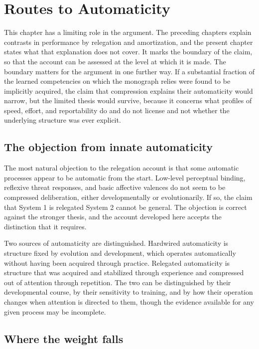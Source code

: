 \documentclass[11pt]{report}
\theoremstyle{remark}
\theoremstyle{definition}
\begin{document}
\chapter{Routes to Automaticity}\label{ch:hardwired}

This chapter has a limiting role in the argument. The preceding chapters explain contrasts in performance by relegation and amortization, and the present chapter states what that explanation does not cover. It marks the boundary of the claim, so that the account can be assessed at the level at which it is made. The boundary matters for the argument in one further way. If a substantial fraction of the learned competencies on which the monograph relies were found to be implicitly acquired, the claim that compression explains their automaticity would narrow, but the limited thesis would survive, because it concerns what profiles of speed, effort, and reportability do and do not license and not whether the underlying structure was ever explicit.

\section{The objection from innate automaticity}

The most natural objection to the relegation account is that some automatic processes appear to be automatic from the start. Low-level perceptual binding, reflexive threat responses, and basic affective valences do not seem to be compressed deliberation, either developmentally or evolutionarily. If so, the claim that System 1 is relegated System 2 cannot be general. The objection is correct against the stronger thesis, and the account developed here accepts the distinction that it requires.

Two sources of automaticity are distinguished. Hardwired automaticity is structure fixed by evolution and development, which operates automatically without having been acquired through practice. Relegated automaticity is structure that was acquired and stabilized through experience and compressed out of attention through repetition. The two can be distinguished by their developmental course, by their sensitivity to training, and by how their operation changes when attention is directed to them, though the evidence available for any given process may be incomplete.

\section{Where the weight falls}
\end{document}
